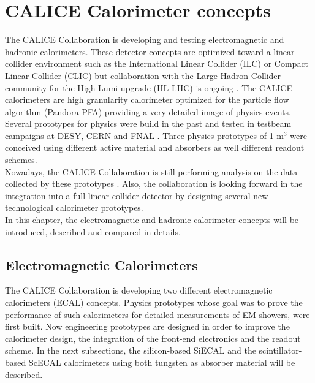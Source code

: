\chapter{CALICE Calorimeter concepts}

The CALICE Collaboration is developing and testing electromagnetic and hadronic calorimeters. These detector concepts are optimized toward a linear collider environment such as the International Linear Collider (ILC) \cite{Behnke:2013lya} or Compact Linear Collider (CLIC) \cite{2012arXiv1202.5940L} but collaboration with the Large Hadron Collider community for the High-Lumi upgrade (HL-LHC) is ongoing \cite{1748-0221-12-01-C01042}. The CALICE calorimeters are high granularity calorimeter optimized for the particle flow algorithm (Pandora PFA) providing a very detailed image of physics events.\\
Several prototypes for physics were build in the past and tested in testbeam campaigns at DESY, CERN and FNAL \cite{1748-0221-3-08-P08001, 1748-0221-5-05-P05004, 1707.07126v2, 1748-0221-10-10-P10039, 1748-0221-3-05-P05001}. Three physics prototypes of 1 m$^3$ were conceived using different active material and absorbers as well different readout schemes.\\
Nowadays, the CALICE Collaboration is still performing analysis on the data collected by these prototypes \cite{OskarCAN, YasmineCAN}. Also, the collaboration is looking forward in the integration into a full linear collider detector by designing several new technological calorimeter prototypes.\\
In this chapter, the electromagnetic and hadronic calorimeter concepts will be introduced, described and compared in details.

\section{Electromagnetic Calorimeters}

The CALICE Collaboration is developing two different electromagnetic calorimeters (ECAL) concepts. Physics prototypes whose goal was to prove the performance of such calorimeters for detailed measurements of EM showers, were first built. Now engineering prototypes are designed in order to improve the calorimeter design, the integration of the front-end electronics and the readout scheme. In the next subsections, the silicon-based SiECAL and the scintillator-based ScECAL calorimeters using both tungsten as absorber material will be described.

